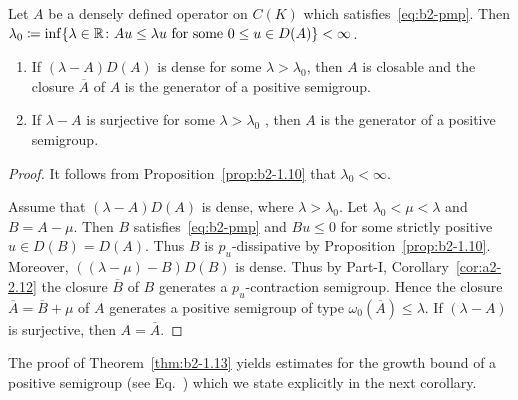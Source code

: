 \begin{theorem}\label{thm:b2-1.13}
Let $A$ be a densely defined operator on $C(K)$ which satisfies~\eqref{eq:b2-pmp}.
Then
$
    \lambda_{0} \coloneq \inf\{\lambda \in \R \colon Au \leq \lambda u \text{ for some } 0 \leq  u \in D(A)\} < \infty
$.
\begin{enumerate}[\upshape (i)]
\item \label{thm:b2-1.13-1}
If\/ $(\lambda - A)D(A)$ is dense for some $\lambda > \lambda_{0}$, then $A$ is closable and the closure $\overline{A}$ of\/ $A$ is the generator of a positive semigroup.

\item \label{thm:b2-1.13-2}
If\/ $\lambda - A$ is surjective for some $\lambda > \lambda_{0}$ , then $A$ is the generator of a positive semigroup.
\end{enumerate}
\end{theorem}
\begin{proof}
It follows from Proposition~\ref{prop:b2-1.10} that $\lambda_{0} < \infty$.

Assume that $(\lambda - A)D(A)$ is dense, where $\lambda > \lambda_{0}$.
Let $\lambda_{0} < \mu < \lambda$ and $B = A - \mu$.
Then $B$ satisfies~\eqref{eq:b2-pmp} and $Bu \leq 0$ for some strictly positive $u \in D(B) = D(A)$.
Thus $B$ is $p_{u}$-dissipative by Proposition~\ref{prop:b2-1.10}.
Moreover, $((\lambda-\mu) - B)D(B)$ is dense.
Thus by Part-I, Corollary~\ref{cor:a2-2.12} 
the closure $\overline{B}$ of\/ $B$ generates a $p_{u}$-contraction semigroup.
Hence the
closure $\overline{A} = \overline{B} + \mu$ of\/ $A$ generates a positive semigroup of type $\omega_{0}(\overline{A}) \leq \lambda$.
If\/ $(\lambda - A)$ is surjective, then $A = \overline{A}$.
\end{proof}
The proof of Theorem~\ref{thm:b2-1.13} yields estimates for the growth bound of a positive semigroup (see Eq.~) which we state explicitly in the next corollary.

